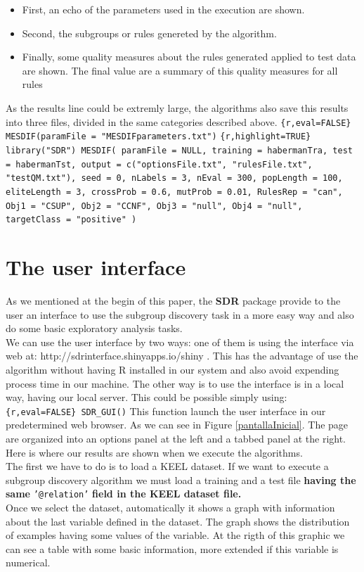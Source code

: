 \documentclass[]{article}
\begin{document}
\begin{itemize}
\item First, an echo of the parameters used in the execution are shown.
\item Second, the subgroups or rules genereted by the algorithm.
\item Finally, some quality measures about the rules generated applied to test data are shown. The final value are a summary of this quality measures for all rules
\end{itemize}

As the results line could be extremly large, the algorithms also save
this results into three files, divided in the same categories described
above.
\texttt{\{r,eval=FALSE\} MESDIF(paramFile = "MESDIFparameters.txt")}
\texttt{\{r,highlight=TRUE\} library("SDR") MESDIF( paramFile = NULL,         training = habermanTra,         test = habermanTst,         output = c("optionsFile.txt", "rulesFile.txt", "testQM.txt"),         seed = 0,         nLabels = 3,         nEval = 300,         popLength = 100,         eliteLength = 3,         crossProb = 0.6,         mutProb = 0.01,         RulesRep = "can",         Obj1 = "CSUP",         Obj2 = "CCNF",         Obj3 = "null",         Obj4 = "null",         targetClass = "positive"         )}

\section{The user interface}\label{the-user-interface}

As we mentioned at the begin of this paper, the \textbf{SDR} package
provide to the user an interface to use the subgroup discovery task in a
more easy way and also do some basic exploratory analysis tasks.\\We can
use the user interface by two ways: one of them is using the interface
via web at: http://sdrinterface.shinyapps.io/shiny . This has the
advantage of use the algorithm without having R installed in our system
and also avoid expending process time in our machine. The other way is
to use the interface is in a local way, having our local server. This
could be possible simply using: \texttt{\{r,eval=FALSE\} SDR\_GUI()}
This function launch the user interface in our predetermined web
browser. As we can see in Figure \ref{pantallaInicial}. The page are
organized into an options panel at the left and a tabbed panel at the
right. Here is where our results are shown when we execute the
algorithms.\\The first we have to do is to load a KEEL dataset. If we
want to execute a subgroup discovery algorithm we must load a training
and a test file \textbf{having the same} \texttt{'@relation'}
\textbf{field in the KEEL dataset file.}\\Once we select the dataset,
automatically it shows a graph with information about the last variable
defined in the dataset. The graph shows the distribution of examples
having some values of the variable. At the rigth of this graphic we can
see a table with some basic information, more extended if this variable
is numerical.
\end{document}
